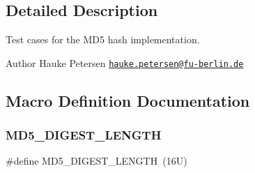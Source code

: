 \subsection{Detailed Description}
Test cases for the M\+D5 hash implementation. 

\begin{DoxyAuthor}{Author}
Hauke Petersen \href{mailto:hauke.petersen@fu-berlin.de}{\tt hauke.\+petersen@fu-\/berlin.\+de} 
\end{DoxyAuthor}


\subsection{Macro Definition Documentation}
\mbox{\label{tests-hashes-md5_8c_a09a4f4b2f28cbe522d9b80153666029c}} 
\subsubsection{\texorpdfstring{M\+D5\+\_\+\+D\+I\+G\+E\+S\+T\+\_\+\+L\+E\+N\+G\+TH}{MD5\_DIGEST\_LENGTH}}
{\footnotesize\ttfamily \#define M\+D5\+\_\+\+D\+I\+G\+E\+S\+T\+\_\+\+L\+E\+N\+G\+TH~(16\+U)}

